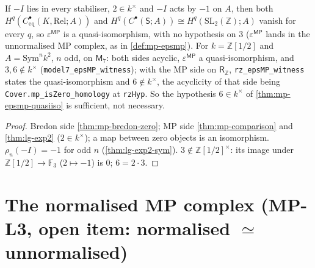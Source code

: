 \begin{theorem}\label{thm:mp-epsmp-witness}
  \leanok
  If $-I$ lies in every stabiliser, $2\in k^\times$ and $-I$ acts by $-1$ on $A$, then both $H^q(C^\bullet_{\mathrm{eq}}(K,\mathrm{Rel};A))$
  and $H^q(C^\bullet(\mathsf S;A))\cong H^q(\mathrm{SL}_2(\mathbb Z);A)$ vanish for every $q$, so $\varepsilon^{\mathsf{MP}}$ is a
  quasi-isomorphism, with no hypothesis on $3$ ($\varepsilon^{\mathsf{MP}}$ lands in the unnormalised MP complex, as in
  \ref{def:mp-epsmp}).  For $k=\mathbb Z[1/2]$ and $A=\mathrm{Sym}^nk^2$, $n$ odd, on $\mathsf M_7$: both sides acyclic, $\varepsilon^{\mathsf{MP}}$ a
  quasi-isomorphism, and $3,6\notin k^\times$ (\texttt{model7\_epsMP\_witness}); with the MP side on $\mathsf R_{\mathbb Z}$,
  \texttt{rz\_epsMP\_witness} states the quasi-isomorphism and $6\notin k^\times$, the acyclicity of that side being
  \texttt{Cover.mp\_isZero\_homology} at \texttt{rzHyp}.  So
  the hypothesis $6\in k^\times$ of \ref{thm:mp-epsmp-quasiiso} is sufficient, not necessary.
\end{theorem}
\begin{proof}
  \leanok
  Bredon side \ref{thm:mp-bredon-zero}; MP side \ref{thm:mp-comparison} and \ref{thm:lg-exp2} ($2\in k^\times$); a map between zero
  objects is an isomorphism.  $\rho_n(-I)=-1$ for odd $n$ (\ref{thm:lg-exp2-sym}).  $3\notin\mathbb Z[1/2]^\times$: its image under
  $\mathbb Z[1/2]\to\mathbb F_3$ ($2\mapsto-1$) is $0$; $6=2\cdot3$.
\end{proof}

\section{The normalised MP complex (MP-L3, open item: normalised \texorpdfstring{$\simeq$}{~} unnormalised)}

